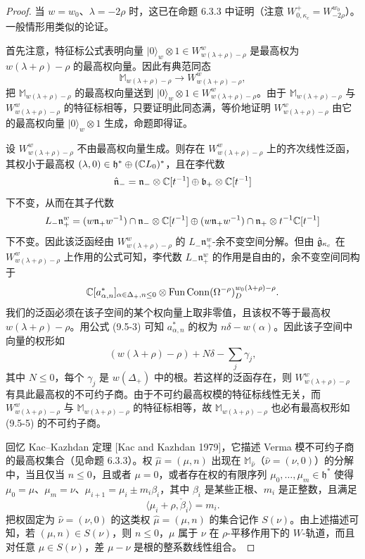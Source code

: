 \begin{proof}
    当 $w=w_0$、$\lambda=-2\rho$ 时，这已在命题 6.3.3 中证明（注意 $W^+_{0,\kappa_c}=W^{w_0}_{-2\rho}$）。一般情形用类似的论证。

    首先注意，特征标公式表明向量 $|0\rangle_w\otimes1\in W^w_{w(\lambda+\rho)-\rho}$ 是最高权为 $w(\lambda+\rho)-\rho$ 的最高权向量。因此有典范同态
    \[
        \mathbb{M}_{w(\lambda+\rho)-\rho}\to W^w_{w(\lambda+\rho)-\rho},
    \]
    把 $\mathbb{M}_{w(\lambda+\rho)-\rho}$ 的最高权向量送到 $|0\rangle_w\otimes1\in W^w_{w(\lambda+\rho)-\rho}$。由于 $\mathbb{M}_{w(\lambda+\rho)-\rho}$ 与 $W^w_{w(\lambda+\rho)-\rho}$ 的特征标相等，只要证明此同态满，等价地证明 $W^w_{w(\lambda+\rho)-\rho}$ 由它的最高权向量 $|0\rangle_w\otimes1$ 生成，命题即得证。

    设 $W^w_{w(\lambda+\rho)-\rho}$ 不由最高权向量生成。则存在 $W^w_{w(\lambda+\rho)-\rho}$ 上的齐次线性泛函，其权小于最高权 $(\lambda,0)\in\mathfrak{h}^*\oplus(\mathbb{C} L_0)^*$，且在李代数
    \[
        \hat{\mathfrak{n}}_-=\mathfrak{n}_-\otimes\mathbb{C}[t^{-1}]\oplus\mathfrak{b}_+\otimes\mathbb{C}[t^{-1}]
    \]
    下不变，从而在其子代数
    \[
        L_-\mathfrak{n}^w_+=(w\mathfrak{n}_+w^{-1})\cap\mathfrak{n}_-\otimes\mathbb{C}[t^{-1}]
        \oplus(w\mathfrak{n}_+w^{-1})\cap\mathfrak{n}_+\otimes t^{-1}\mathbb{C}[t^{-1}]
    \]
    下不变。因此该泛函经由 $W^w_{w(\lambda+\rho)-\rho}$ 的 $L_-\mathfrak{n}^w_+$-余不变空间分解。但由 $\hat{\mathfrak{g}}_{\kappa_c}$ 在 $W^w_{w(\lambda+\rho)-\rho}$ 上作用的公式可知，李代数 $L_-\mathfrak{n}^w_+$ 的作用是自由的，余不变空间同构于
    \[
        \mathbb{C}[a^*_{\alpha,n}]_{\alpha\in\Delta_+,n\le0}
        \otimes\operatorname{Fun}\operatorname{Conn}(\Omega^{-\rho})^{w_0(\lambda+\rho)-\rho}_D .
    \]
    我们的泛函必须在该子空间的某个权向量上取非零值，且该权不等于最高权 $w(\lambda+\rho)-\rho$。用公式 (9.5-3) 可知 $a^*_{\alpha,n}$ 的权为 $n\delta-w(\alpha)$。因此该子空间中向量的权形如
    \begin{equation}
        (w(\lambda+\rho)-\rho)+N\delta-\sum_j\gamma_j,
        \tag{9.5-5}
    \end{equation}
    其中 $N\le0$，每个 $\gamma_j$ 是 $w(\Delta_+)$ 中的根。若这样的泛函存在，则 $W^w_{w(\lambda+\rho)-\rho}$ 有具此最高权的不可约子商。由于不可约最高权模的特征标线性无关，而 $W^w_{w(\lambda+\rho)-\rho}$ 与 $\mathbb{M}_{w(\lambda+\rho)-\rho}$ 的特征标相等，故 $\mathbb{M}_{w(\lambda+\rho)-\rho}$ 也必有最高权形如 (9.5-5) 的不可约子商。

    回忆 Kac–Kazhdan 定理 [Kac and Kazhdan 1979]，它描述 Verma 模不可约子商的最高权集合（见命题 6.3.3）。权 $\hat\mu=(\mu,n)$ 出现在 $\mathbb{M}_{\hat\nu}$（$\hat\nu=(\nu,0)$）的分解中，当且仅当 $n\le0$，且或者 $\mu=0$，或者存在权的有限序列 $\mu_0,\dots,\mu_m\in\mathfrak{h}^*$ 使得 $\mu_0=\mu$、$\mu_m=\nu$、$\mu_{i+1}=\mu_i\pm m_i\beta_i$，其中 $\beta_i$ 是某些正根、$m_i$ 是正整数，且满足
    \begin{equation}
        \langle\mu_i+\rho,\check\beta_i\rangle=m_i.
        \tag{9.5-6}
    \end{equation}
    把权固定为 $\hat\nu=(\nu,0)$ 的这类权 $\hat\mu=(\mu,n)$ 的集合记作 $S(\nu)$。由上述描述可知，若 $(\mu,n)\in S(\nu)$，则 $n\le0$，$\mu$ 属于 $\nu$ 在 $\rho$-平移作用下的 $W$-轨道，而且对任意 $\mu\in S(\nu)$，差 $\mu-\nu$ 是根的整系数线性组合。


\end{proof}
